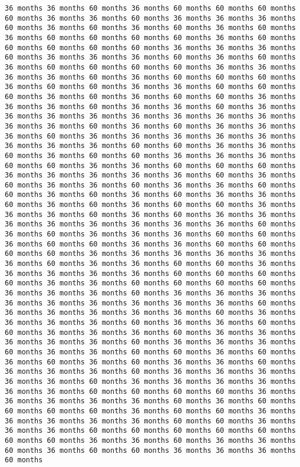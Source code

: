 \documentclass[11pt]{article}
\begin{document}
\begin{Verbatim}[commandchars=\\\{\}, frame=single, framerule=2mm, rulecolor=\color{outerrorbackground}]
36 months 36 months 60 months 36 months 60 months 60 months 60 months 60 months 36 months 36 months 60 months 36 months 36 months 36 months 60 months 36 months 60 months 36 months 60 months 36 months 60 months 36 months 60 months 60 months 60 months 60 months 36 months 60 months 60 months 60 months 60 months 60 months 36 months 36 months 36 months 60 months 36 months 36 months 36 months 60 months 36 months 60 months 36 months 60 months 60 months 60 months 60 months 36 months 36 months 36 months 36 months 60 months 36 months 60 months 60 months 60 months 36 months 60 months 60 months 36 months 36 months 60 months 60 months 60 months 36 months 60 months 36 months 60 months 60 months 36 months 36 months 36 months 60 months 36 months 36 months 60 months 36 months 36 months 36 months 36 months 36 months 36 months 36 months 36 months 36 months 36 months 60 months 36 months 60 months 36 months 36 months 36 months 60 months 36 months 36 months 36 months 36 months 36 months 36 months 36 months 36 months 60 months 60 months 36 months 36 months 60 months 36 months 60 months 60 months 36 months 36 months 36 months 60 months 60 months 36 months 36 months 60 months 60 months 60 months 36 months 36 months 36 months 36 months 36 months 60 months 36 months 60 months 36 months 36 months 60 months 36 months 36 months 60 months 60 months 36 months 60 months 36 months 60 months 36 months 36 months 60 months 36 months 60 months 36 months 60 months 60 months 36 months 36 months 36 months 60 months 36 months 60 months 36 months 36 months 36 months 36 months 36 months 36 months 36 months 36 months 60 months 36 months 60 months 36 months 36 months 36 months 60 months 60 months 36 months 60 months 60 months 36 months 36 months 60 months 60 months 60 months 60 months 36 months 36 months 36 months 36 months 36 months 36 months 60 months 36 months 36 months 60 months 60 months 36 months 36 months 36 months 36 months 36 months 60 months 60 months 60 months 60 months 36 months 36 months 60 months 60 months 60 months 60 months 36 months 36 months 36 months 60 months 36 months 36 months 36 months 36 months 36 months 36 months 36 months 36 months 36 months 60 months 36 months 36 months 36 months 36 months 36 months 60 months 36 months 36 months 36 months 36 months 60 months 36 months 36 months 60 months 60 months 36 months 36 months 36 months 60 months 36 months 36 months 36 months 36 months 36 months 60 months 36 months 36 months 36 months 60 months 36 months 36 months 60 months 60 months 36 months 60 months 36 months 60 months 36 months 60 months 36 months 36 months 60 months 36 months 36 months 36 months 60 months 36 months 36 months 36 months 36 months 36 months 60 months 36 months 36 months 36 months 36 months 36 months 36 months 60 months 60 months 60 months 60 months 36 months 36 months 36 months 36 months 36 months 60 months 36 months 60 months 60 months 60 months 60 months 36 months 60 months 60 months 36 months 36 months 36 months 36 months 36 months 60 months 60 months 36 months 36 months 36 months 60 months 60 months 60 months 60 months 60 months 60 months 60 months 36 months 36 months 60 months 36 months 36 months 60 months 36 months 60 months 60 months 36 months 36 months 36 months 60 months 
\end{Verbatim}
\end{document}
